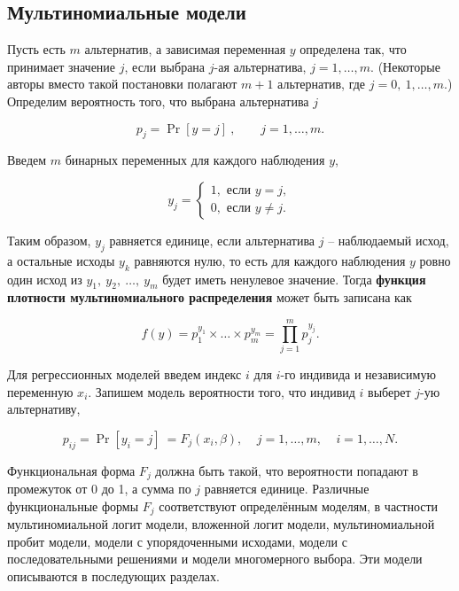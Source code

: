 \subsection{Мультиномиальные модели}

Пусть есть $m$ альтернатив, а зависимая переменная $y$ определена так, что принимает значение $j$, если выбрана $j$-ая альтернатива, $j=1,\dots ,m.$ (Некоторые авторы вместо такой постановки полагают $m+1$ альтернатив, где $j=0,\ 1,\dots ,m.$) Определим вероятность того, что выбрана альтернатива $j$

\begin{equation} 
\label{GrindEQ__15_1_} 
p_j={\Pr  \left[y=j\right]\ },\ \ \ \ \ \ \ \ \ j=1,\dots ,m. 
\end{equation} 

Введем $m$ бинарных переменных для каждого наблюдения $y$,

\begin{equation} \label{GrindEQ__15_2_} 
y_j=\left\{ \begin{array}{c}
1,\text{ если } y=j, \\ 
0,\text{ если } y\ne j. 
\end{array}
\right. 
\end{equation} 

Таким образом, $y_j$ равняется единице, если альтернатива $j$ -- наблюдаемый исход, а остальные исходы $y_k$ равняются нулю, то есть для каждого наблюдения $y$ ровно один исход из $y_1,\ y_2,\ \dots ,\ y_m$ будет иметь ненулевое значение. Тогда \textbf{функция плотности мультиномиального распределения } может быть записана как

\begin{equation} \label{GrindEQ__15_3_} f\left(y\right)=p^{y_1}_1\times \dots \times p^{y_m}_m=\prod^m_{j=1}{p^{y_j}_j}. \end{equation} 

Для регрессионных моделей введем индекс $i$ для $i$-го индивида и независимую переменную $x_i$. Запишем модель вероятности того, что индивид $i$ выберет $j$-ую альтернативу,

\begin{equation} \label{GrindEQ__15_4_} p_{ij}={\Pr  \left[y_i=j\right]\ }=F_j\left(x_i,\beta \right),\ \ \ \ \ j=1,\dots ,m,\ \ \ \ \ i=1,\dots ,N. \end{equation} 

Функциональная форма $F_j$ должна быть такой, что вероятности попадают в промежуток от 0 до 1, а сумма по $j$ равняется единице. Различные функциональные формы $F_j$ соответствуют определённым моделям, в частности мультиномиальной логит модели, вложенной логит модели, мультиномиальной пробит модели, модели с упорядоченными исходами, модели с последовательными решениями и модели многомерного выбора. Эти модели описываются в последующих разделах.

